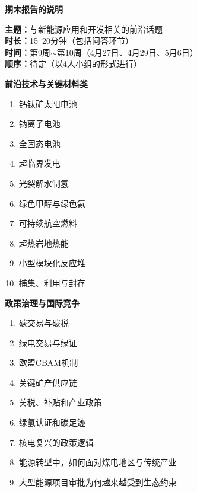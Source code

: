 \documentclass[12pt,a4paper,UTF8]{ctexart}
\begin{document}
\begin{center}
    \Huge\bfseries\textcolor{red!80!black}{期末报告的说明}
\end{center}

\vspace{0.5cm}
\noindent\textbf{主题：}与新能源应用和开发相关的前沿话题\\
\textbf{时长：}15~20分钟（包括问答环节）\\
\textbf{时间：}第9周$\sim$第10周（4月27日、4月29日、5月6日）\\
\textbf{顺序：}待定（以4人小组的形式进行）

\vspace{0.5cm}

\noindent\textbf{\textcolor{purple!80!black}{前沿技术与关键材料类}}
\begin{enumerate}
    \item 钙钛矿太阳电池
    \item 钠离子电池
    \item 全固态电池
    \item 超临界发电
    \item 光裂解水制氢
    \item 绿色甲醇与绿色氨
    \item 可持续航空燃料
    \item 超热岩地热能
    \item 小型模块化反应堆
    \item {}捕集、利用与封存
\end{enumerate}

\vspace{0.3cm}
\noindent\textbf{\textcolor{purple!80!black}{政策治理与国际竞争}}
\begin{enumerate}
    \item 碳交易与碳税
    \item 绿电交易与绿证
    \item 欧盟CBAM机制
    \item 关键矿产供应链
    \item 关税、补贴和产业政策
    \item 绿氢认证和碳足迹
    \item 核电复兴的政策逻辑
    \item 能源转型中，如何面对煤电地区与传统产业
    \item 大型能源项目审批为何越来越受到生态约束
\end{enumerate}
\end{document}
